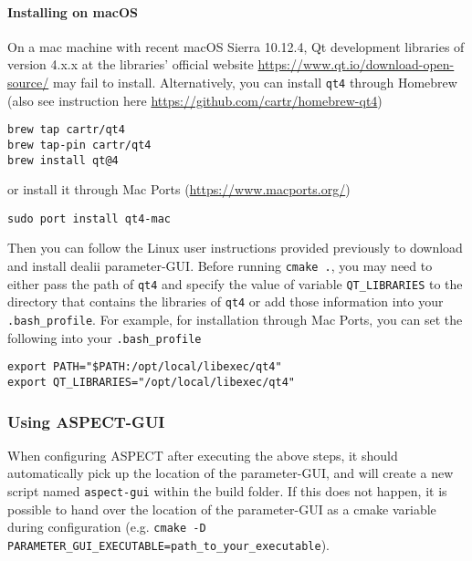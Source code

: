 \documentclass{article}
\newcommand{\aspect}{\textsc{ASPECT}}
\begin{document}
\paragraph{Installing on macOS} On a mac machine with recent macOS Sierra 10.12.4, Qt development libraries of version 4.x.x at the libraries' official website \url{https://www.qt.io/download-open-source/} may fail to install.  Alternatively, you can install \texttt{qt4} through Homebrew (also see instruction here \url{https://github.com/cartr/homebrew-qt4})
\begin{verbatim}
brew tap cartr/qt4
brew tap-pin cartr/qt4
brew install qt@4
\end{verbatim}
or install it through Mac Ports (\url{https://www.macports.org/})
\begin{verbatim}
sudo port install qt4-mac
\end{verbatim}
Then you can follow the Linux user instructions provided previously to download and install dealii parameter-GUI. 
Before running \texttt{cmake .}, you may need to either pass the path of \texttt{qt4} and specify the value of variable \texttt{QT\_LIBRARIES} to the directory that contains the libraries of \texttt{qt4}
or add those information into your \texttt{.bash\_profile}. For example, for installation through Mac Ports, you can set the following into your \texttt{.bash\_profile}
\begin{verbatim}
export PATH="$PATH:/opt/local/libexec/qt4"
export QT_LIBRARIES="/opt/local/libexec/qt4"
\end{verbatim}




\subsubsection{Using \aspect{}-GUI}

When configuring \aspect{} after executing the above steps, it should automatically pick up the
location of the parameter-GUI, and will create a new script named \texttt{aspect-gui} within the build folder.
If this does not happen, it is possible to hand over the location of the parameter-GUI as a cmake
variable during configuration (e.g. \texttt{cmake -D PARAMETER\_GUI\_EXECUTABLE=path\_to\_your\_executable}).
\end{document}
